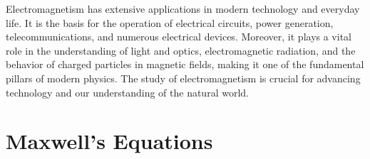 Electromagnetism has extensive applications in modern technology and everyday life. It is the basis for the operation of electrical circuits, power generation, telecommunications, and numerous electrical devices. Moreover, it plays a vital role in the understanding of light and optics, electromagnetic radiation, and the behavior of charged particles in magnetic fields, making it one of the fundamental pillars of modern physics. The study of electromagnetism is crucial for advancing technology and our understanding of the natural world.
















\section{Maxwell's Equations}





















